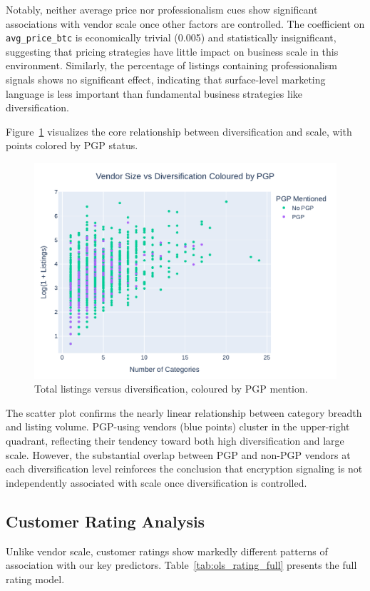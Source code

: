 \documentclass{article}
\begin{document}
Notably, neither average price nor professionalism cues show significant associations with vendor scale once other factors are controlled. The coefficient on \texttt{avg\_price\_btc} is economically trivial (0.005) and statistically insignificant, suggesting that pricing strategies have little impact on business scale in this environment. Similarly, the percentage of listings containing professionalism signals shows no significant effect, indicating that surface-level marketing language is less important than fundamental business strategies like diversification.

Figure~\ref{fig:scatter_div_size} visualizes the core relationship between diversification and scale, with points colored by PGP status.

\begin{figure}[htbp]
  \centering
  \includegraphics[width=.75\textwidth]{scatter_div_size.pdf}
  \caption{Total listings versus diversification, coloured by PGP mention.}
  \label{fig:scatter_div_size}
\end{figure}

The scatter plot confirms the nearly linear relationship between category breadth and listing volume. PGP-using vendors (blue points) cluster in the upper-right quadrant, reflecting their tendency toward both high diversification and large scale. However, the substantial overlap between PGP and non-PGP vendors at each diversification level reinforces the conclusion that encryption signaling is not independently associated with scale once diversification is controlled.

\subsection{Customer Rating Analysis}

Unlike vendor scale, customer ratings show markedly different patterns of association with our key predictors. Table~\ref{tab:ols_rating_full} presents the full rating model.
\end{document}
